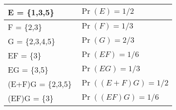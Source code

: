 \begin{tabular}{|l|l|}\hline
E = \{1,3,5\}	&$\Pr(E) = 1/2$\\\hline
F = \{2,3\}	&$\Pr(F) = 1/3$\\\hline
G = \{2,3,4,5\}	&$\Pr(G) = 2/3$\\\hline
EF = \{3\}	&$\Pr(EF) = 1/6$\\\hline
EG = \{3,5\}	&$\Pr(EG) = 1/3$\\\hline
(E+F)G = \{2,3,5\}	&$\Pr((E+F)G) = 1/2$\\\hline
(EF)G = \{3\}	&$\Pr((EF)G) = 1/6$\\\hline
\end{tabular}
